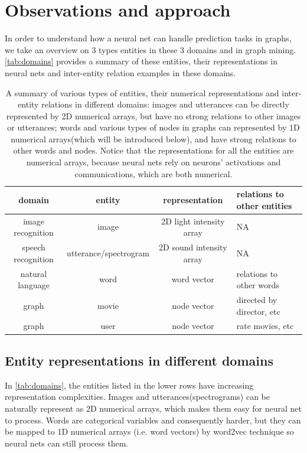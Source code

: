 \documentclass{article}
\begin{document}
\section{Observations and approach}
In order to understand how a neural net can handle prediction tasks in graphs, 
we take an overview on 3 types entities in these 3 domains and in graph mining. 
\autoref{tab:domains} provides a summary of these entities, their 
representations in neural nets and inter-entity relation examples in these 
domains.
\begin{table}[H]
	\centering
	\begin{tabularx}{\textwidth}{ |c|c|c|X| }
		\hline domain & entity & representation & relations to other entities 
		\\ 
		\hline image recognition & image & 2D light intensity array & NA \\ 
		\hline speech recognition & utterance/spectrogram & 2D sound intensity 
		array & NA \\ 
		\hline natural language & word & word vector & relations to other words 
		\\ 
		\hline graph & movie & node vector & directed by director, etc \\ 
		\hline graph & user & node vector & rate movies, etc \\
		\hline
	\end{tabularx}
	\caption{A summary of various types of entities, their numerical 
	representations and inter-entity relations in different domains: images and 
	utterances can be directly represented by 2D numerical arrays, but have no 
	strong relations to other images or utterances; words and various types of 
	nodes in graphs can represented by 1D numerical arrays(which will be 
	introduced below), and have strong relations to other words and nodes. 
	Notice that the representations for all the entities are numerical arrays, 
	because neural nets rely on neurons' activations and communications, which 
	are both numerical.}
	\label{tab:domains}
\end{table}

\subsection{Entity representations in different domains}
In \autoref{tab:domains}, the entities listed in the lower rows have increasing 
representation complexities. Images and utterances(spectrograms) can be 
naturally represent as 2D numerical arrays, which makes them easy for neural 
net to process. Words are categorical variables and consequently harder, but 
they can be mapped to 1D numerical arrays (i.e. word vectors) by word2vec 
technique \cite{mikolov2013efficient} so neural nets can still process them.
\end{document}
